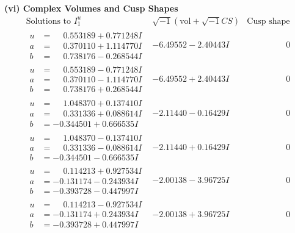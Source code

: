 \documentclass[1p]{elsarticle_modified}
\theoremstyle{definition}
\newcommand{\I}{\sqrt{-1}}
\begin{document}
\newpage\flushleft \textbf{(vi) Complex Volumes and Cusp Shapes}
$$\begin{array}{c|c|c}  
\text{Solutions to }I^u_{1}& \I (\text{vol} + \sqrt{-1}CS) & \text{Cusp shape}\\
 \hline 
\begin{aligned}
u &= \phantom{-}0.553189 + 0.771248 I \\
a &= \phantom{-}0.370110 + 1.114770 I \\
b &= \phantom{-}0.738176 - 0.268544 I\end{aligned}
 & -6.49552 - 2.40443 I & \phantom{-0.000000 } 0 \\ \hline\begin{aligned}
u &= \phantom{-}0.553189 - 0.771248 I \\
a &= \phantom{-}0.370110 - 1.114770 I \\
b &= \phantom{-}0.738176 + 0.268544 I\end{aligned}
 & -6.49552 + 2.40443 I & \phantom{-0.000000 } 0 \\ \hline\begin{aligned}
u &= \phantom{-}1.048370 + 0.137410 I \\
a &= \phantom{-}0.331336 + 0.088614 I \\
b &= -0.344501 + 0.666535 I\end{aligned}
 & -2.11440 - 0.16429 I & \phantom{-0.000000 } 0 \\ \hline\begin{aligned}
u &= \phantom{-}1.048370 - 0.137410 I \\
a &= \phantom{-}0.331336 - 0.088614 I \\
b &= -0.344501 - 0.666535 I\end{aligned}
 & -2.11440 + 0.16429 I & \phantom{-0.000000 } 0 \\ \hline\begin{aligned}
u &= \phantom{-}0.114213 + 0.927534 I \\
a &= -0.131174 - 0.243934 I \\
b &= -0.393728 - 0.447997 I\end{aligned}
 & -2.00138 - 3.96725 I & \phantom{-0.000000 } 0 \\ \hline\begin{aligned}
u &= \phantom{-}0.114213 - 0.927534 I \\
a &= -0.131174 + 0.243934 I \\
b &= -0.393728 + 0.447997 I\end{aligned}
 & -2.00138 + 3.96725 I & \phantom{-0.000000 } 0 \\ \hline\begin{aligned}

\end{aligned}
\end{array}$$
\end{document}
